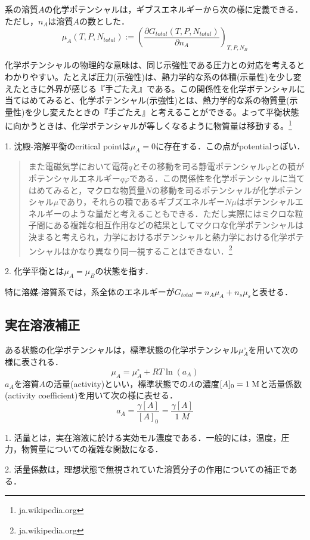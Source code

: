 \documentclass[uplatex, dvipdfmx]{jsreport}
\begin{document}
\begin{definition}
    系の溶質$A$の化学ポテンシャルは，ギブスエネルギーから次の様に定義できる．ただし，$n_A$は溶質$A$の数とした．
    \[ \mu_A(T,P,N_{total}) := \left(\frac{\partial G_{total}(T,P,N_{total})}{\partial n_A}\right)_{T,P,N_B} \]
\end{definition}
\begin{explanation}[天才的アナロジー]
    化学ポテンシャルの物理的な意味は、同じ示強性である圧力との対応を考えるとわかりやすい。たとえば圧力(示強性)は、熱力学的な系の体積(示量性)を少し変えたときに外界が感じる『手ごたえ』である。この関係性を化学ポテンシャルに当てはめてみると、化学ポテンシャル(示強性)とは、熱力学的な系の物質量(示量性)を少し変えたときの『手ごたえ』と考えることができる。よって平衡状態に向かうときは、化学ポテンシャルが等しくなるように物質量は移動する。\footnote{ja.wikipedia.org}
\end{explanation}
\begin{definition}
    1. 沈殿-溶解平衡のcritical pointは$\mu_A=0$に存在する．この点がpotentialっぽい．

    \begin{quote}
        また電磁気学において電荷$q$とその移動を司る静電ポテンシャル$\varphi$との積がポテンシャルエネルギー$q\varphi$である．この関係性を化学ポテンシャルに当てはめてみると，マクロな物質量$N$の移動を司るポテンシャルが化学ポテンシャル$\mu$であり，それらの積であるギブズエネルギー$N\mu$はポテンシャルエネルギーのような量だと考えることもできる．ただし実際にはミクロな粒子間にある複雑な相互作用などの結果としてマクロな化学ポテンシャルは決まると考えられ，力学におけるポテンシャルと熱力学における化学ポテンシャルはかなり異なり同一視することはできない．\footnote{ja.wikipedia.org}
    \end{quote}

    2. 化学平衡とは$\mu_A=\mu_B$の状態を指す．
\end{definition}

\begin{remark}
    特に溶媒-溶質系では，系全体のエネルギーが$G_{total}=n_A\mu_A+n_s\mu_s$と表せる．
\end{remark}

\subsection{実在溶液補正}

\begin{definition}\label{def-activity-coefficient}
    ある状態の化学ポテンシャルは，標準状態の化学ポテンシャル$\mu_A^\circ$を用いて次の様に表される．
    \[ \mu_A=\mu^\circ_A+RT\ln(a_A) \]
    $a_A$を溶質$A$の活量(activity)といい，標準状態での$A$の濃度$[A]_0=1\;\rm{M}$と活量係数(activity coefficient)を用いて次の様に表せる．
    \[ a_A=\frac{\gamma [A]}{[A]_0} = \frac{\gamma [A]}{1\;M} \]
\end{definition}
\begin{remark}
    1. 活量とは，実在溶液に於ける実効モル濃度である．一般的には，温度，圧力，物質量についての複雑な関数になる．
    
    2. 活量係数は，理想状態で無視されていた溶質分子の作用についての補正である．
\end{remark}
\end{document}
